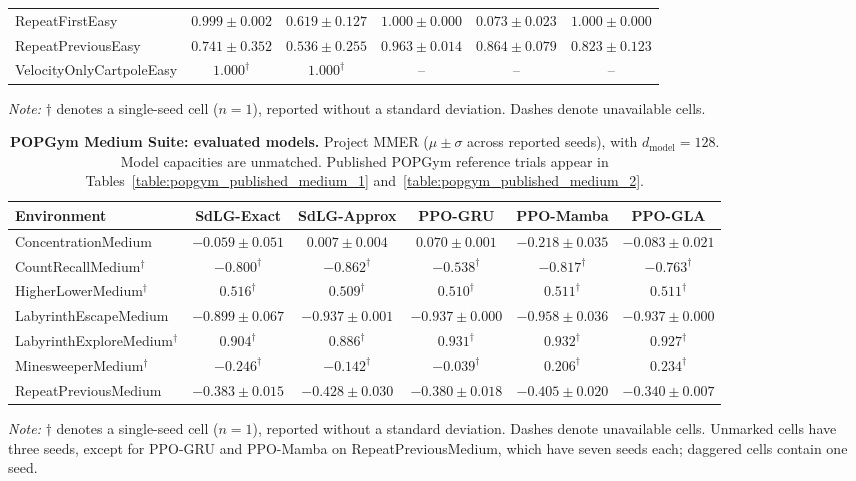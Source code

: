 \begin{table}[H]
\begin{tabular}{@{}p{}ccccc@{}}
RepeatFirstEasy & $0.999 \pm 0.002$ & $0.619 \pm 0.127$ & $1.000 \pm 0.000$ & $0.073 \pm 0.023$ & $1.000 \pm 0.000$ \\
RepeatPreviousEasy & $0.741 \pm 0.352$ & $0.536 \pm 0.255$ & $0.963 \pm 0.014$ & $0.864 \pm 0.079$ & $0.823 \pm 0.123$ \\
VelocityOnlyCartpoleEasy & $1.000^\dagger$ & $1.000^\dagger$ & -- & -- & -- \\
\bottomrule
\end{tabular}
\par\smallskip\raggedright
\textit{Note:} $\dagger$ denotes a single-seed cell ($n=1$), reported without a standard deviation. Dashes denote unavailable cells.
\end{table}

\begin{table}[H]
\centering\small
\setlength{\tabcolsep}{3pt}
\renewcommand{\arraystretch}{1.12}
\caption{\textbf{POPGym Medium Suite: evaluated models.} Project MMER ($\mu\pm\sigma$ across reported seeds), with $d_{\mathrm{model}}=128$. Model capacities are unmatched. Published POPGym reference trials appear in Tables~\ref{table:popgym_published_medium_1} and~\ref{table:popgym_published_medium_2}.}
\label{table:popgym_medium_full}
\begin{tabular}{@{}p{}ccccc@{}}
\toprule
Environment & SdLG-Exact & SdLG-Approx & PPO-GRU & PPO-Mamba & PPO-GLA \\
\midrule
ConcentrationMedium & $-0.059 \pm 0.051$ & $0.007 \pm 0.004$ & $0.070 \pm 0.001$ & $-0.218 \pm 0.035$ & $-0.083 \pm 0.021$ \\
CountRecallMedium$^\dagger$ & $-0.800^\dagger$ & $-0.862^\dagger$ & $-0.538^\dagger$ & $-0.817^\dagger$ & $-0.763^\dagger$ \\
HigherLowerMedium$^\dagger$ & $0.516^\dagger$ & $0.509^\dagger$ & $0.510^\dagger$ & $0.511^\dagger$ & $0.511^\dagger$ \\
LabyrinthEscapeMedium & $-0.899 \pm 0.067$ & $-0.937 \pm 0.001$ & $-0.937 \pm 0.000$ & $-0.958 \pm 0.036$ & $-0.937 \pm 0.000$ \\
LabyrinthExploreMedium$^\dagger$ & $0.904^\dagger$ & $0.886^\dagger$ & $0.931^\dagger$ & $0.932^\dagger$ & $0.927^\dagger$ \\
MinesweeperMedium$^\dagger$ & $-0.246^\dagger$ & $-0.142^\dagger$ & $-0.039^\dagger$ & $0.206^\dagger$ & $0.234^\dagger$ \\
RepeatPreviousMedium & $-0.383 \pm 0.015$ & $-0.428 \pm 0.030$ & $-0.380 \pm 0.018$ & $-0.405 \pm 0.020$ & $-0.340 \pm 0.007$ \\
\bottomrule
\end{tabular}
\par\smallskip\raggedright
\textit{Note:} $\dagger$ denotes a single-seed cell ($n=1$), reported without a standard deviation. Dashes denote unavailable cells.
Unmarked cells have three seeds, except for PPO-GRU and PPO-Mamba on RepeatPreviousMedium, which have seven seeds each; daggered cells contain one seed.
\end{table}

